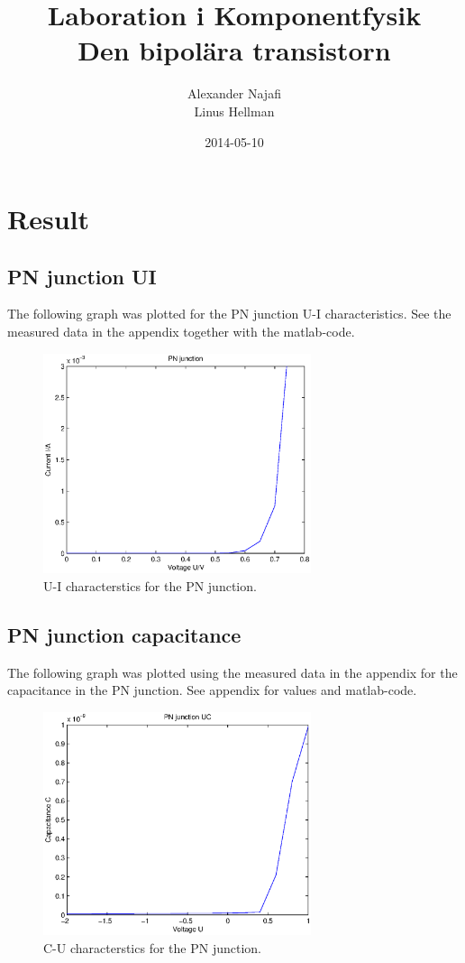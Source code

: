 \documentclass[a4paper]{article}
\title{Laboration i Komponentfysik\\ Den bipolära transistorn}
\author{Alexander Najafi \\ Linus Hellman}
\date{2014-05-10}
\begin{document}
\maketitle
\thispagestyle{empty}
\newpage

\tableofcontents
\newpage

\section{Result}
\subsection{PN junction UI}
The following graph was plotted for the PN junction U-I characteristics. See the measured data in the appendix together with the matlab-code. 
\begin{figure}[H]
	\centering
	\includegraphics[width=0.7\textwidth]{pn_ui.eps}
	\caption{U-I characterstics for the PN junction.}	
	\label{pn_ui}
\end{figure}

\subsection{PN junction capacitance}
The following graph was plotted using the measured data in the appendix for the capacitance in the PN junction. See appendix for values and matlab-code. 
\begin{figure}[H]
	\centering
	\includegraphics[width=0.7\textwidth]{pn_cap.eps}
	\caption{C-U characterstics for the PN junction.}	
	\label{pn_cap}
\end{figure}
\end{document}
